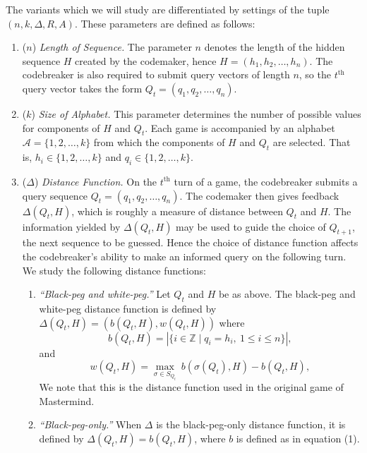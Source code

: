\documentclass[12pt, a4paper]{article}
\newcommand{\Z}{\mathbb{Z}}           %
\newcommand{\nth}{^{\text{th}}}       %
\begin{document}
The variants which we will study are differentiated by settings of the tuple $(n, k, \Delta, R, A)$. These parameters are defined as follows:
\begin{enumerate}[label=(\roman*)]
	\item ($n$) \textit{Length of Sequence.} The parameter $n$ denotes the length of the hidden sequence $H$ created by the codemaker, hence $H = (h_1, h_2, \ldots, h_n)$. The codebreaker is also required to submit query vectors of length $n$, so the $t\nth$ query vector takes the form $Q_t = (q_1, q_2, \ldots, q_n)$.
	
	\item ($k$) \textit{Size of Alphabet.} This parameter determines the number of possible values for components of $H$ and $Q_t$. Each game is accompanied by an alphabet $\mathcal{A} = \{1,2,\ldots,k\}$ from which the components of $H$ and $Q_t$ are selected. That is, $h_i\in\{1,2,\ldots,k\}$ and $q_i\in\{1,2,\ldots,k\}$.
	
	\item($\Delta$) \textit{Distance Function.} On the $t\nth$ turn of a game, the codebreaker submits a query sequence $Q_t = (q_1, q_2, \ldots, q_n)$. The codemaker then gives feedback $\Delta(Q_t, H)$, which is roughly a measure of distance between $Q_t$ and $H$. The information yielded by $\Delta(Q_t, H)$ may be used to guide the choice of $Q_{t+1}$, the next sequence to be guessed. Hence the choice of distance function affects the codebreaker's ability to make an informed query on the following turn. We study the following distance functions:
	\begin{enumerate}[label=\alph*.]
		\item\textit{``Black-peg and white-peg.''} Let $Q_t$ and $H$ be as above. The black-peg and white-peg distance function is defined by $\Delta(Q_t, H) = (b(Q_t, H), w(Q_t, H))$ where
		\begin{equation}
			b(Q_t, H) = \left|\{i\in\Z\mid q_i = h_i,~ 1\le i\le n\}\right|,
		\end{equation}
		and
		\begin{equation*}
			w(Q_t, H) = \max_{\sigma\in S_{Q_t}}~b(\sigma(Q_t), H) - b(Q_t, H),
		\end{equation*}
		We note that this is the distance function used in the original game of Mastermind.

		\item\textit{``Black-peg-only.''} When $\Delta$ is the black-peg-only distance function, it is defined by $\Delta(Q_t, H) = b(Q_t, H)$, where $b$ is defined as in equation (1).
	\end{enumerate}
	

\end{enumerate}
\end{document}

